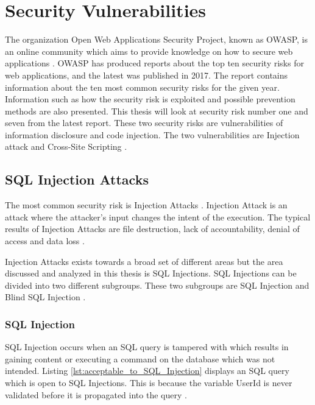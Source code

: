 \section{Security Vulnerabilities}
\label{SecurityVulnerabilities}
The organization Open Web Applications Security Project, known as OWASP, is an online community which aims to provide knowledge on how to secure web applications \parencite{OpenWebApplicationSecurityProject}. OWASP has produced reports about the top ten security risks for web applications, and the latest was published in 2017. The report contains information about the ten most common security risks for the given year. Information such as how the security risk is exploited and possible prevention methods are also presented. This thesis will look at security risk number one and seven from the latest report. These two security risks are vulnerabilities of information disclosure and code injection. The two vulnerabilities are Injection attack and Cross-Site Scripting \parencite{OWASP2017}.



\subsection{SQL Injection Attacks}
The most common security risk is Injection Attacks \parencite{OWASP2017}. Injection Attack is an attack where the attacker's input changes the intent of the execution. The typical results of Injection Attacks are file destruction, lack of accountability, denial of access and data loss \parencite{Secure_Web}.

Injection Attacks exists towards a broad set of different areas but the area discussed and analyzed in this thesis is SQL Injections. SQL Injections can be divided into two different subgroups. These two subgroups are SQL Injection and Blind SQL Injection \parencite{Secure_Web}.



\subsubsection{SQL Injection}
SQL Injection occurs when an SQL query is tampered with which results in gaining content or executing a command on the database which was not intended. Listing \ref{lst:acceptable_to_SQL_Injection} displays an SQL query which is open to SQL Injections. This is because the variable UserId is never validated before it is propagated into the query \parencite{JustinClarke-Salt2009SIAa, Secure_Web}.

